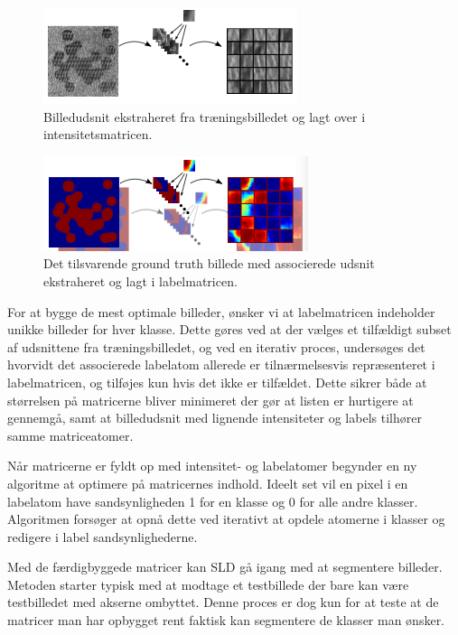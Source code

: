 \begin{figure}[H]
		\centering
		\includegraphics[scale=1]{files/postmethod/img/dict_1.png}
	\caption{Billedudsnit ekstraheret fra træningsbilledet og lagt over i intensitetsmatricen. \label{fig:postmethod_intensitydict_init}}
\end{figure}

\begin{figure}[H]
		\centering
		\includegraphics[scale=1]{files/postmethod/img/dict_2.png}
	\caption{Det tilsvarende ground truth billede med associerede udsnit ekstraheret og lagt i labelmatricen.\label{fig:postmethod_labeldict_init}}
\end{figure}

For at bygge de mest optimale billeder, ønsker vi at labelmatricen indeholder unikke billeder for hver klasse. Dette gøres ved at der vælges et tilfældigt subset af udsnittene fra træningsbilledet, og ved en iterativ proces, undersøges det hvorvidt det associerede labelatom allerede er tilnærmelsesvis repræsenteret i labelmatricen, og tilføjes kun hvis det ikke er tilfældet. Dette sikrer både at størrelsen på matricerne bliver minimeret der gør at listen er hurtigere at gennemgå, samt at billedudsnit med lignende intensiteter og labels tilhører samme matriceatomer. 

Når matricerne er fyldt op med intensitet- og labelatomer begynder en ny algoritme at optimere på matricernes indhold. Ideelt set vil en pixel i en labelatom have sandsynligheden 1 for en klasse og 0 for alle andre klasser. Algoritmen forsøger at opnå dette ved iterativt at opdele atomerne i klasser og redigere i label sandsynlighederne. 

Med de færdigbyggede matricer kan SLD gå igang med at segmentere billeder. Metoden starter typisk med at modtage et testbillede der bare kan være testbilledet med akserne ombyttet. Denne proces er dog kun for at teste at de matricer man har opbygget rent faktisk kan segmentere de klasser man ønsker.

